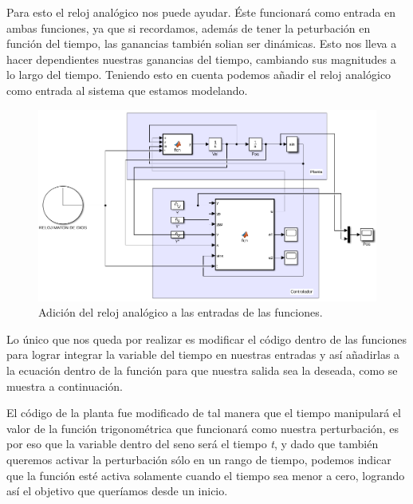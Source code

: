 \documentclass[12pt, letterpaper]{article}
\begin{document}
Para esto el reloj analógico nos puede ayudar. Éste funcionará como entrada en ambas funciones, ya que si recordamos, además de tener la peturbación en función del tiempo, las ganancias también solian ser dinámicas. Esto nos lleva a hacer dependientes nuestras ganancias del tiempo, cambiando sus magnitudes a lo largo del tiempo. Teniendo esto en cuenta podemos añadir el reloj analógico como entrada al sistema que estamos modelando.

\begin{figure}[H]
	\centering
	\includegraphics[width=\textwidth]{clock.png}
	\caption{Adición del reloj analógico a las entradas de las funciones.}
\end{figure}

Lo único que nos queda por realizar es modificar el código dentro de las funciones para lograr integrar la variable del tiempo en nuestras entradas y así añadirlas a la ecuación dentro de la función para que nuestra salida sea la deseada, como se muestra a continuación.



El código de la planta fue modificado de tal manera que el tiempo manipulará el valor de la función trigonométrica que funcionará como nuestra perturbación, es por eso que la variable dentro del seno será el tiempo \textit{t}, y dado que también queremos activar la perturbación sólo en un rango de tiempo, podemos indicar que la función esté activa solamente cuando el tiempo sea menor a cero, logrando así el objetivo que queríamos desde un inicio.


\end{document}
